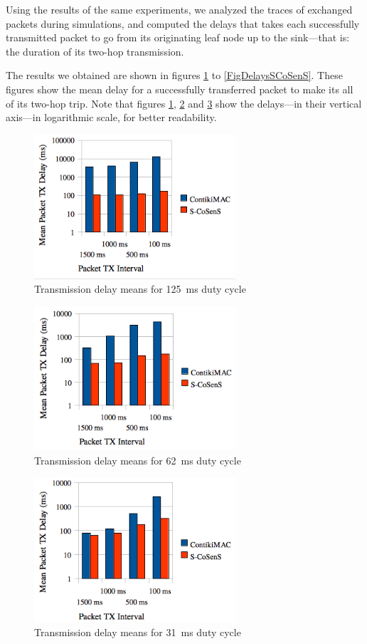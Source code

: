 \documentclass[a4paper,twoside]{article}
\begin{document}
Using the results of the same experiments, we analyzed the traces of
exchanged packets during simulations, and computed the delays that takes each
successfully transmitted packet to go from its originating leaf node up to
the sink---that is: the duration of its two-hop transmission.

The results we obtained are shown in figures \ref{FigDelays8Hz} to
\ref{FigDelaysSCoSenS}. These figures show the mean delay for
a successfully transferred packet to make its all of its two-hop trip.
Note that figures \ref{FigDelays8Hz}, \ref{FigDelays16Hz} and
\ref{FigDelays32Hz} show the delays---in their vertical axis---in
logarithmic scale, for better readability.

\begin{figure}
  \centering
  \includegraphics[width=7.5cm]{graphes/Delays8Hz.png}
  \caption{Transmission delay means for 125~ms duty cycle}
  \label{FigDelays8Hz}
\end{figure}
\begin{figure}
  \centering
  \includegraphics[width=7.5cm]{graphes/Delays16Hz.png}
  \caption{Transmission delay means for 62~ms duty cycle}
  \label{FigDelays16Hz}
\end{figure}
\begin{figure}
  \centering
  \includegraphics[width=7.5cm]{graphes/Delays32Hz.png}
  \caption{Transmission delay means for 31~ms duty cycle}
  \label{FigDelays32Hz}
\end{figure}
\end{document}
